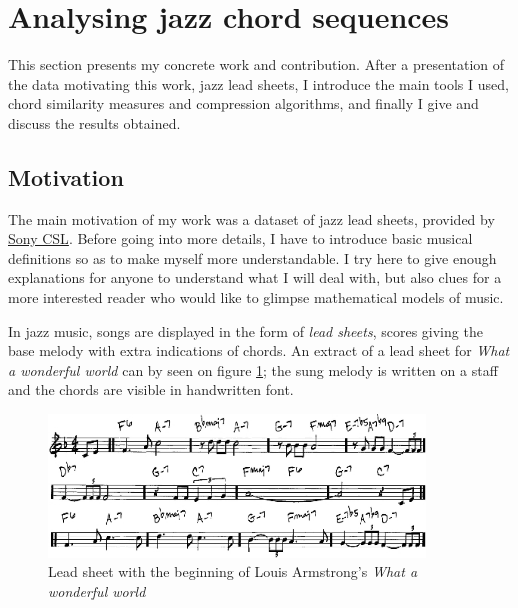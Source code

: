 \documentclass[a4paper,10pt]{article}
\begin{document}
\newpage
\section{Analysing jazz chord sequences}

This section presents my concrete work and contribution. After a presentation of the data motiva\-ting this work, jazz lead sheets, I introduce the main tools I used, chord similarity measures and compression algorithms, and finally I give and discuss the results obtained.

\subsection{Motivation}

The main motivation of my work was a dataset of jazz lead sheets, provided by \href{http://www.csl.sony.fr/music.php}{Sony CSL}. Before going into more details, I have to introduce basic musical definitions so as to make myself more understandable. I try here to give enough explanations for anyone to understand what I will deal with, but also clues for a more interested reader who would like to glimpse mathematical models of music.

In jazz music, songs are displayed in the form of \emph{lead sheets}, scores giving the base melody with extra indications of chords. An extract of a lead sheet for \emph{What a wonderful world} can by seen on figure \ref{waww}; the sung melody is written on a staff and the chords are visible in handwritten font.

\begin{figure}[h!]
\centering
\includegraphics[width=10cm]{images/waww.jpg}
\caption{Lead sheet with the beginning of Louis Armstrong's \emph{What a wonderful world}\label{waww}}
\end{figure}
\end{document}
